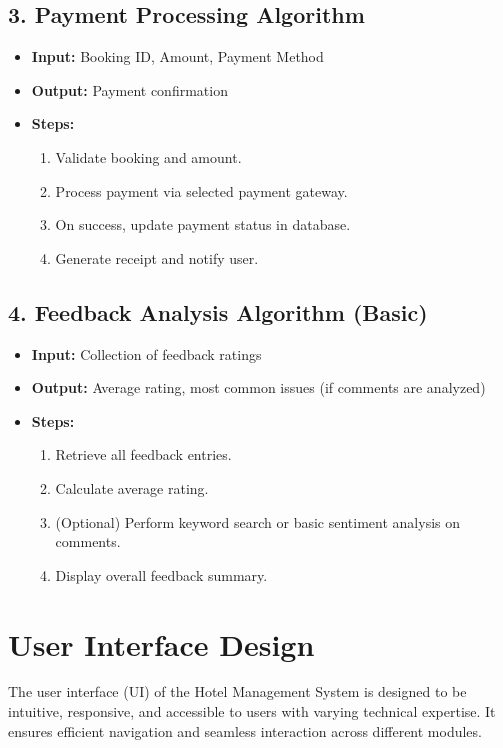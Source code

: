 \documentclass[a4paper,12pt]{article}
\begin{document}
\subsection{3. Payment Processing Algorithm}
\begin{itemize}
    \item \textbf{Input:} Booking ID, Amount, Payment Method
    \item \textbf{Output:} Payment confirmation
    \item \textbf{Steps:}
    \begin{enumerate}
        \item Validate booking and amount.
        \item Process payment via selected payment gateway.
        \item On success, update payment status in database.
        \item Generate receipt and notify user.
    \end{enumerate}
\end{itemize}

\subsection{4. Feedback Analysis Algorithm (Basic)}
\begin{itemize}
    \item \textbf{Input:} Collection of feedback ratings
    \item \textbf{Output:} Average rating, most common issues (if comments are analyzed)
    \item \textbf{Steps:}
    \begin{enumerate}
        \item Retrieve all feedback entries.
        \item Calculate average rating.
        \item (Optional) Perform keyword search or basic sentiment analysis on comments.
        \item Display overall feedback summary.
    \end{enumerate}
\end{itemize}

\section{User Interface Design}

The user interface (UI) of the Hotel Management System is designed to be intuitive, responsive, and accessible to users with varying technical expertise. It ensures efficient navigation and seamless interaction across different modules.
\end{document}
